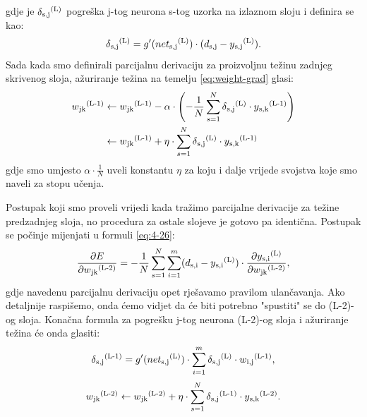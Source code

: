\documentclass[times, utf8, zavrsni]{fer}
\begin{document}
gdje je $\delta\textsubscript{s,j}\textsuperscript{(L)}$ pogreška j-tog neurona s-tog uzorka na izlaznom sloju i definira se kao:
\begin{equation}
    \label{eq:delta-izlaz}
    \delta\textsubscript{s,j}\textsuperscript{(L)} = g'(net\textsubscript{s,j}\textsuperscript{(L)})\cdot(d\textsubscript{s,j} - y\textsubscript{s,j}\textsuperscript{(L)}).
\end{equation}
Sada kada smo definirali parcijalnu derivaciju za proizvoljnu težinu zadnjeg skrivenog sloja, ažuriranje težina na temelju \eqref{eq:weight-grad} glasi:
\begin{align}
    w\textsubscript{jk}\textsuperscript{(L-1)} &\leftarrow w\textsubscript{jk}\textsuperscript{(L-1)} - \alpha\cdot \left(-\frac{1}{N}\sum\limits_{s=1}^N \delta\textsubscript{s,j}\textsuperscript{(L)} \cdot y\textsubscript{s,k}\textsuperscript{(L-1)}\right) \\
    &\leftarrow w\textsubscript{jk}\textsuperscript{(L-1)} + \eta\cdot\sum\limits_{s=1}^N \delta\textsubscript{s,j}\textsuperscript{(L)} \cdot y\textsubscript{s,k}\textsuperscript{(L-1)}
\end{align}
gdje smo umjesto $\alpha \cdot \frac{1}{N}$ uveli konstantu $\eta$ za koju i dalje vrijede svojstva koje smo naveli za stopu učenja.

\bigskip

Postupak koji smo proveli vrijedi kada tražimo parcijalne derivacije za težine predzadnjeg sloja, no procedura za ostale slojeve je gotovo pa identična. Postupak se počinje mijenjati u formuli \eqref{eq:4-26}:
\begin{equation}
    \frac{\partial E}{\partial w\textsubscript{jk}\textsuperscript{(L-2)}} =
    -\frac{1}{N}\sum\limits_{s=1}^N\sum\limits_{i=1}^m(d\textsubscript{s,i} - y\textsubscript{s,i}\textsuperscript{(L)})\cdot{\frac{\partial y\textsubscript{s,i}\textsuperscript{(L)}}{\partial w\textsubscript{jk}\textsuperscript{(L-2)}}},
\end{equation}
gdje navedenu parcijalnu derivaciju opet rješavamo pravilom ulančavanja. Ako detaljnije raspišemo, onda ćemo vidjet da će biti potrebno "spustiti" se do (L-2)-og sloja. Konačna formula za pogrešku j-tog neurona (L-2)-og sloja i ažuriranje težina će onda glasiti: 
\begin{equation}
    \label{eq:delta-ostali}
    \delta\textsubscript{s,j}\textsuperscript{(L-1)} = g'(net\textsubscript{s,j}\textsuperscript{(L)})\cdot\sum\limits_{i=1}^m\delta\textsubscript{s,j}\textsuperscript{(L)}\cdot w\textsubscript{i,j}\textsuperscript{(L-1)},
\end{equation}
\begin{equation}
    w\textsubscript{jk}\textsuperscript{(L-2)} \leftarrow w\textsubscript{jk}\textsuperscript{(L-2)} + \eta\cdot\sum\limits_{s=1}^N \delta\textsubscript{s,j}\textsuperscript{(L-1)} \cdot y\textsubscript{s,k}\textsuperscript{(L-2)}.
\end{equation}
\end{document}
